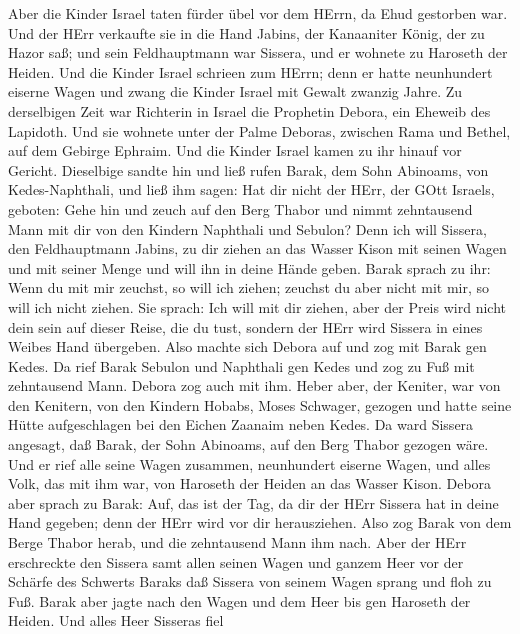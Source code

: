  Aber die Kinder Israel taten fürder übel vor dem HErrn, da
Ehud gestorben war.  Und der HErr verkaufte sie in die Hand
Jabins, der Kanaaniter König, der zu Hazor saß; und sein Feldhauptmann
war Sissera, und er wohnete zu Haroseth der Heiden.  Und die
Kinder Israel schrieen zum HErrn; denn er hatte neunhundert eiserne
Wagen und zwang die Kinder Israel mit Gewalt zwanzig Jahre. 
Zu derselbigen Zeit war Richterin in Israel die Prophetin Debora, ein
Eheweib des Lapidoth.  Und sie wohnete unter der Palme
Deboras, zwischen Rama und Bethel, auf dem Gebirge Ephraim. Und die
Kinder Israel kamen zu ihr hinauf vor Gericht.  Dieselbige
sandte hin und ließ rufen Barak, dem Sohn Abinoams, von Kedes-Naphthali,
und ließ ihm sagen: Hat dir nicht der HErr, der GOtt Israels, geboten:
Gehe hin und zeuch auf den Berg Thabor und nimmt zehntausend Mann mit
dir von den Kindern Naphthali und Sebulon?  Denn ich will
Sissera, den Feldhauptmann Jabins, zu dir ziehen an das Wasser Kison mit
seinen Wagen und mit seiner Menge und will ihn in deine Hände geben.
 Barak sprach zu ihr: Wenn du mit mir zeuchst, so will ich
ziehen; zeuchst du aber nicht mit mir, so will ich nicht ziehen.
 Sie sprach: Ich will mit dir ziehen, aber der Preis wird
nicht dein sein auf dieser Reise, die du tust, sondern der HErr wird
Sissera in eines Weibes Hand übergeben. Also machte sich Debora auf und
zog mit Barak gen Kedes.  Da rief Barak Sebulon und
Naphthali gen Kedes und zog zu Fuß mit zehntausend Mann. Debora zog auch
mit ihm.  Heber aber, der Keniter, war von den Kenitern,
von den Kindern Hobabs, Moses Schwager, gezogen und hatte seine Hütte
aufgeschlagen bei den Eichen Zaanaim neben Kedes.  Da ward
Sissera angesagt, daß Barak, der Sohn Abinoams, auf den Berg Thabor
gezogen wäre.  Und er rief alle seine Wagen zusammen,
neunhundert eiserne Wagen, und alles Volk, das mit ihm war, von Haroseth
der Heiden an das Wasser Kison.  Debora aber sprach zu
Barak: Auf, das ist der Tag, da dir der HErr Sissera hat in deine Hand
gegeben; denn der HErr wird vor dir herausziehen. Also zog Barak von dem
Berge Thabor herab, und die zehntausend Mann ihm nach. 
Aber der HErr erschreckte den Sissera samt allen seinen Wagen und ganzem
Heer vor der Schärfe des Schwerts Baraks daß Sissera von seinem Wagen
sprang und floh zu Fuß.  Barak aber jagte nach den Wagen
und dem Heer bis gen Haroseth der Heiden. Und alles Heer Sisseras fiel
